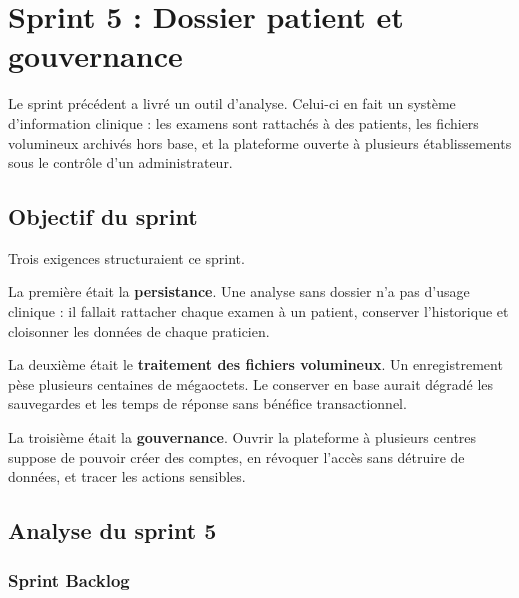 \chapter{Sprint 5 : Dossier patient et gouvernance}
\label{chap:sprint5}


Le sprint précédent a livré un outil d'analyse. Celui-ci en fait un système d'information
clinique : les examens sont rattachés à des patients, les fichiers volumineux archivés hors
base, et la plateforme ouverte à plusieurs établissements sous le contrôle d'un
administrateur.

\section{Objectif du sprint}

Trois exigences structuraient ce sprint.

La première était la \textbf{persistance}. Une analyse sans dossier n'a pas d'usage
clinique : il fallait rattacher chaque examen à un patient, conserver l'historique et
cloisonner les données de chaque praticien.

La deuxième était le \textbf{traitement des fichiers volumineux}. Un enregistrement pèse
plusieurs centaines de mégaoctets. Le conserver en base aurait dégradé les sauvegardes et
les temps de réponse sans bénéfice transactionnel.

La troisième était la \textbf{gouvernance}. Ouvrir la plateforme à plusieurs centres
suppose de pouvoir créer des comptes, en révoquer l'accès sans détruire de données, et
tracer les actions sensibles.

\section{Analyse du sprint 5}

\subsection{Sprint Backlog}

